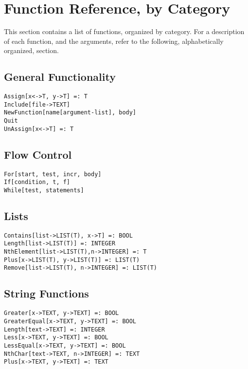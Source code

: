 \section{Function Reference, by Category}

This section contains a list of functions, organized by
category.  For a description of each function, and the arguments,
refer to the following, alphabetically organized, section.

\subsection{General Functionality}

\begin{verbatim}
Assign[x<->T, y->T] =: T
Include[file->TEXT]
NewFunction[name[argument-list], body]
Quit
UnAssign[x<->T] =: T
\end{verbatim}

\subsection{Flow Control}

\begin{verbatim}
For[start, test, incr, body]
If[condition, t, f]
While[test, statements]
\end{verbatim}

\subsection{Lists}

\begin{verbatim}
Contains[list->LIST(T), x->T] =: BOOL
Length[list->LIST(T)] =: INTEGER
NthElement[list->LIST(T),n->INTEGER] =: T 
Plus[x->LIST(T), y->LIST(T)] =: LIST(T)
Remove[list->LIST(T), n->INTEGER] =: LIST(T)
\end{verbatim}

\subsection{String Functions}

\begin{verbatim}
Greater[x->TEXT, y->TEXT] =: BOOL
GreaterEqual[x->TEXT, y->TEXT] =: BOOL
Length[text->TEXT] =: INTEGER
Less[x->TEXT, y->TEXT] =: BOOL
LessEqual[x->TEXT, y->TEXT] =: BOOL
NthChar[text->TEXT, n->INTEGER] =: TEXT
Plus[x->TEXT, y->TEXT] =: TEXT
\end{verbatim}


